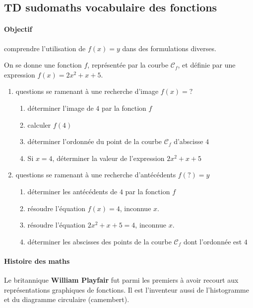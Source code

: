 \documentclass[main.tex]{subfiles}
\begin{document}
\newpage 
\subsection{TD sudomaths vocabulaire des fonctions}
\paragraph{Objectif} comprendre l'utilisation de $f(x)=y$ dans des formulations diverses.

On se donne une fonction $f$, représentée par la courbe $\mathscr{C}_f$, et définie par une expression $f(x)=2x^2+x+5$.
\begin{enumerate}[leftmargin=*,label=\arabic*)]
\item {questions se ramenant à une recherche d'image $f(x)=?$}
\begin{enumerate}[leftmargin=*,label=\alph*)]
	\item déterminer l'image de $4$ par la fonction $f$
	\item calculer $f(4)$
	\item déterminer l'ordonnée du point de la courbe $\mathscr{C}_f$ d'abscisse $4$ 
	\item Si $x=4$, déterminer la valeur de l'expression  $2x^2+x+5$ 
\end{enumerate}
\item {questions se ramenant à une recherche d'antécédents $f(?)=y$ }
	\begin{enumerate}[leftmargin=*,label=\alph*)]
		\item déterminer les antécédents de $4$ par la fonction $f$
		\item résoudre l'équation $f(x)=4$, inconnue $x$.
		\item résoudre l'équation  $2x^2+x+5=4$, inconnue $x$. 
		\item déterminer les abscisses des points de la courbe $\mathscr{C}_f$ dont l'ordonnée est $4$ 
	\end{enumerate} 
\end{enumerate}

\newpage 
\paragraph{Histoire des maths}
Le britannique \textbf{William Playfair} fut parmi les premiers à avoir recourt aux représentations graphiques de fonctions. Il est l'inventeur aussi de l'histogramme et du diagramme circulaire (camembert).
\end{document}
